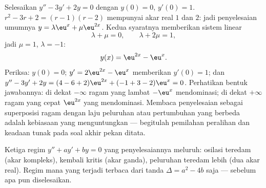 \begin{example}\label{ex:b1:diffeq:cauchy2}
Selesaikan $y'' - 3y' + 2y = 0$ dengan $y(0) = 0$, $y'(0) = 1$.
 $r^2 - 3r + 2 = (r - 1)(r - 2)$ mempunyai
akar real $1$ dan $2$: jadi penyelesaian umumnya $y = \lambda\eu^{x} +
\mu\eu^{2x}$. Kedua syaratnya memberikan sistem linear
\[
\lambda + \mu = 0, \qquad \lambda + 2\mu = 1 ,
\]
jadi $\mu = 1$, $\lambda = -1$:
\[
y(x) = \eu^{2x} - \eu^{x} .
\]
Periksa: $y(0) = 0$; $y' = 2\eu^{2x} - \eu^x$ memberikan $y'(0) = 1$; dan
$y'' - 3y' + 2y = (4 - 6 + 2)\eu^{2x} + (-1 + 3 - 2)\eu^x = 0$.
Perhatikan bentuk jawabannya: di dekat $-\infty$ ragam yang lambat
$-\eu^x$ mendominasi; di dekat $+\infty$ ragam yang cepat $\eu^{2x}$ yang
mendominasi. Membaca penyelesaian sebagai superposisi ragam dengan laju peluruhan
atau pertumbuhan yang berbeda adalah kebiasaan yang menguntungkan --- begitulah
pemilahan peralihan dan keadaan tunak pada soal akhir pekan ditata.
\end{example}

\begin{omfigure}

{\small Ketiga regim $y'' + ay' + by = 0$ yang penyelesaiannya
meluruh: osilasi teredam (akar kompleks), kembali kritis
(akar ganda), peluruhan teredam lebih (dua akar real). Regim mana yang
terjadi terbaca dari tanda $\Delta = a^2 - 4b$ saja ---
sebelum apa pun diselesaikan.}
\end{omfigure}

